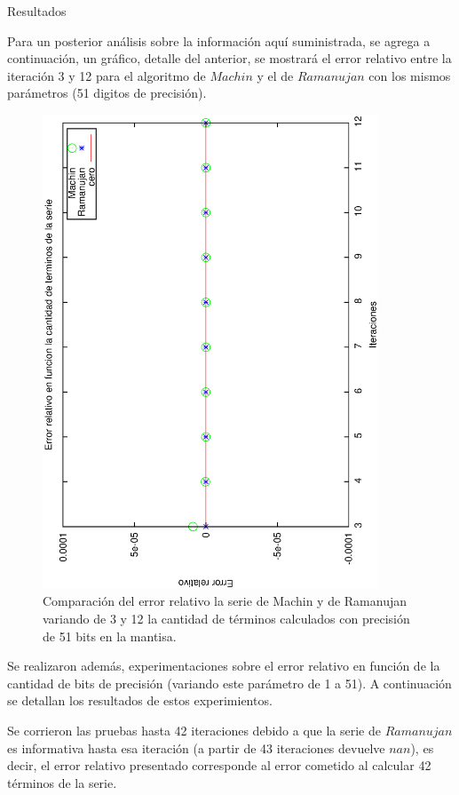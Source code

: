 \begin{section}{Resultados}
	\VSP

	Para un posterior análisis sobre la información aquí suministrada, se agrega a continuación, un gráfico, detalle del anterior, se mostrará el error relativo entre la iteración 3 y 12 para el algoritmo de $Machin$ y el de $Ramanujan$ con los mismos parámetros (51 digitos de precisión).
	
	\begin{figure}[H]
	  \centering
		\includegraphics[width=10cm,angle=-90]{graficos/comparacion_machin-ram.eps}
	  \caption{Comparación del error relativo la serie de Machin y de Ramanujan variando de 3 y 12 la cantidad de términos calculados con precisión de 51 bits en la mantisa.}
	  \label{fig:greg-ram}
	\end{figure}
	
	\VSP
	
	Se realizaron además, experimentaciones sobre el error relativo en función de la cantidad de bits de precisión (variando este parámetro de 1 a 51). A continuación se detallan los resultados de estos experimientos.
	
	Se corrieron las pruebas hasta 42 iteraciones debido a que la serie de $Ramanujan$ es informativa hasta esa iteración (a partir de 43 iteraciones devuelve $nan$), es decir, el error relativo presentado corresponde al error cometido al calcular 42 términos de la serie.
	

\end{section}

